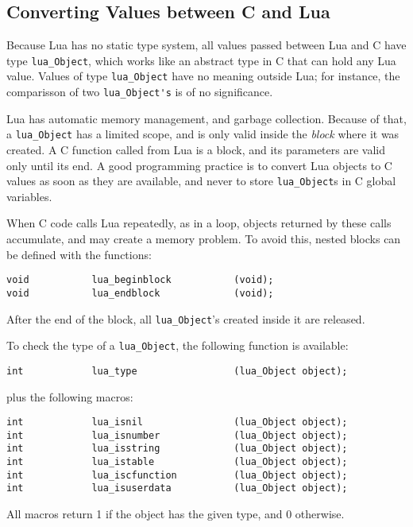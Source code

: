 \subsection{Converting Values between C and Lua} \label{valuesCLua}
Because Lua has no static type system,
all values passed between Lua and C have type
\verb'lua_Object',
which works like an abstract type in C that can hold any Lua value.
Values of type \verb'lua_Object' have no meaning outside Lua;
for instance,
the comparisson of two \verb"lua_Object's" is of no significance.

Lua has automatic memory management, and garbage collection.
Because of that, a \verb'lua_Object' has a limited scope,
and is only valid inside the {\em block\/} where it was created.
A C function called from Lua is a block,
and its parameters are valid only until its end.
A good programming practice is to convert Lua objects to C values
as soon as they are available,
and never to store \verb'lua_Object's in C global variables.

When C code calls Lua repeatedly, as in a loop,
objects returned by these calls accumulate,
and may create a memory problem.
To avoid this,
nested blocks can be defined with the functions:
\begin{verbatim}
void           lua_beginblock           (void);
void           lua_endblock             (void);
\end{verbatim}
After the end of the block,
all \verb'lua_Object''s created inside it are released.

To check the type of a \verb'lua_Object',
the following function is available:
\begin{verbatim}
int            lua_type                 (lua_Object object);
\end{verbatim}
plus the following macros:
\begin{verbatim}
int            lua_isnil                (lua_Object object);
int            lua_isnumber             (lua_Object object);
int            lua_isstring             (lua_Object object);
int            lua_istable              (lua_Object object);
int            lua_iscfunction          (lua_Object object);
int            lua_isuserdata           (lua_Object object);
\end{verbatim}
All macros return 1 if the object has the given type,
and 0 otherwise.


